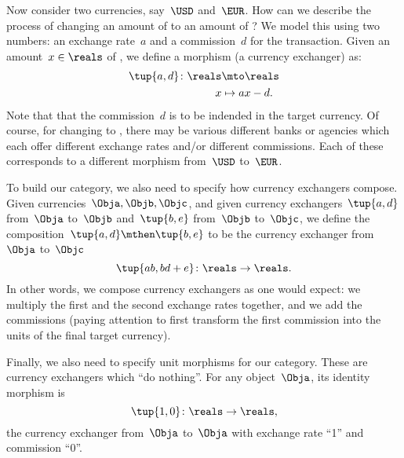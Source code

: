 Now consider two currencies, say~$\USD$ and~$\EUR$.
How can we describe the process of changing an amount of \USD to an amount of \EUR?
We model this using two numbers: an exchange rate~$a$ and a commission~$d$ for the transaction.
Given an amount~$x \in \reals$ of \USD, we define a morphism (a currency exchanger) as:
\begin{equation*}
    \label{eq:def_curr_ex}
    \begin{aligned}
        \tup{a,d}\colon \reals & \mto \reals     \\
        x                      & \mapsto ax - d.
    \end{aligned}
\end{equation*}
Note that that the commission~$d$ is to be indended in the target currency.
Of course, for changing \USD to \EUR, there may be various different banks or agencies which each offer different exchange rates and/or different commissions.
Each of these corresponds to a different morphism from~$\USD$ to~$\EUR$.

To build our category, we also need to specify how currency exchangers compose.
Given currencies~$\Obja, \Objb, \Objc$, and given currency exchangers~$\tup{a,d}$ from~$\Obja$ to~$\Objb$ and~$\tup{b,e}$ from~$\Objb$ to~$\Objc$,
we define the composition~$\tup{a,d} \mthen \tup{b,e}$ to be the currency exchanger from~$\Obja$ to~$\Objc$
\begin{equation}
    \label{eq:comp-law-curr}
    \tup{ab,bd+e} \colon \reals \to \reals.
\end{equation}
In other words, we compose currency exchangers as one would expect: we multiply the first and the second exchange rates together, and we add the commissions (paying attention to first transform the first commission into the units of the final target currency).

Finally, we also need to specify unit morphisms for our category.
These are currency exchangers which ``do nothing''.
For any object~$\Obja$, its identity morphism is
\begin{equation*}
    \tup{1,0} \colon \reals \to \reals,
\end{equation*}
the currency exchanger from~$\Obja$ to~$\Obja$ with exchange rate ``1'' and commission ``0''.

